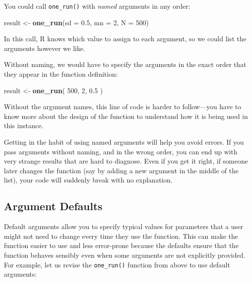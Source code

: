 \documentclass[
]{book}
\newenvironment{Shaded}{\begin{snugshade}}{\end{snugshade}}
\newcommand{\AttributeTok}[1]{\textcolor[rgb]{0.13,0.29,0.53}{#1}}
\newcommand{\DecValTok}[1]{\textcolor[rgb]{0.00,0.00,0.81}{#1}}
\newcommand{\FloatTok}[1]{\textcolor[rgb]{0.00,0.00,0.81}{#1}}
\newcommand{\FunctionTok}[1]{\textcolor[rgb]{0.13,0.29,0.53}{\textbf{#1}}}
\newcommand{\NormalTok}[1]{#1}
\newcommand{\OtherTok}[1]{\textcolor[rgb]{0.56,0.35,0.01}{#1}}
\begin{document}
You could call \texttt{one\_run()} with \emph{named} arguments in any order:

\begin{Shaded}
\begin{Highlighting}[]
\NormalTok{result }\OtherTok{\textless{}{-}} \FunctionTok{one\_run}\NormalTok{(}\AttributeTok{sd =} \FloatTok{0.5}\NormalTok{, }\AttributeTok{mn =} \DecValTok{2}\NormalTok{, }\AttributeTok{N =} \DecValTok{500}\NormalTok{)}
\end{Highlighting}
\end{Shaded}

In this call, R knows which value to assign to each argument, so we could list the arguments however we like.

Without naming, we would have to specify the arguments in the exact order that they appear in the function definition:

\begin{Shaded}
\begin{Highlighting}[]
\NormalTok{result }\OtherTok{\textless{}{-}} \FunctionTok{one\_run}\NormalTok{( }\DecValTok{500}\NormalTok{, }\DecValTok{2}\NormalTok{, }\FloatTok{0.5}\NormalTok{ )}
\end{Highlighting}
\end{Shaded}

Without the argument names, this line of code is harder to follow---you have to know more about the design of the function to understand how it is being used in this instance.

Getting in the habit of using named arguments will help you avoid errors.
If you pass arguments without naming, and in the wrong order, you can end up with very strange results that are hard to diagnose.
Even if you get it right, if someone later changes the function (say by adding a new argument in the middle of the list), your code will suddenly break with no explanation.

\subsection{Argument Defaults}\label{argument-defaults}

Default arguments allow you to specify typical values for parameters that a user might not need to change every time they use the function.
This can make the function easier to use and less error-prone because the defaults ensure that the function behaves sensibly even when some arguments are not explicitly provided. For example, let us revise the \texttt{one\_run()} function from above to use default arguments:
\end{document}
